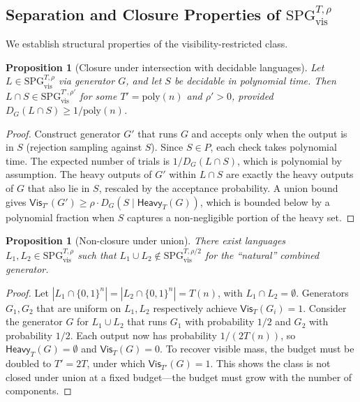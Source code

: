 \documentclass[11pt]{article}
\newcommand{\SPGvis}[2]{\mathrm{SPG}_{\mathrm{vis}}^{#1,#2}}
\newtheorem{proposition}[definition]{Proposition}
\theoremstyle{remark}
\theoremstyle{definition}
\begin{document}
\subsection{Separation and Closure Properties of $\SPGvis{T}{\rho}$}\label{sec:spg-vis-closure}

We establish structural properties of the visibility-restricted class.

\begin{proposition}[Closure under intersection with decidable languages]\label{prop:closure-intersection}
Let $L \in \SPGvis{T}{\rho}$ via generator $G$, and let $S$ be decidable in
polynomial time.  Then $L \cap S \in \SPGvis{T'}{\rho'}$ for some
$T' = \mathrm{poly}(n)$ and $\rho' > 0$, provided
$D_G(L \cap S) \ge 1/\mathrm{poly}(n)$.
\end{proposition}

\begin{proof}
Construct generator $G'$ that runs $G$ and accepts only when the output is in
$S$ (rejection sampling against $S$).  Since $S \in P$, each check takes
polynomial time.  The expected number of trials is $1/D_G(L \cap S)$, which
is polynomial by assumption.  The heavy outputs of $G'$ within $L \cap S$ are
exactly the heavy outputs of $G$ that also lie in $S$, rescaled by the
acceptance probability.  A union bound gives $\mathsf{Vis}_{T'}(G') \ge
\rho \cdot D_G(S \mid \mathsf{Heavy}_T(G))$, which is bounded below by a
polynomial fraction when $S$ captures a non-negligible portion of the heavy
set.
\end{proof}

\begin{proposition}[Non-closure under union]\label{prop:non-closure-union}
There exist languages $L_1, L_2 \in \SPGvis{T}{\rho}$ such that
$L_1 \cup L_2 \notin \SPGvis{T}{\rho/2}$ for the ``natural'' combined
generator.
\end{proposition}

\begin{proof}
Let $|L_1 \cap \{0,1\}^n| = |L_2 \cap \{0,1\}^n| = T(n)$, with $L_1 \cap L_2 = \emptyset$.
Generators $G_1, G_2$ that are uniform on $L_1, L_2$ respectively achieve
$\mathsf{Vis}_T(G_i) = 1$.  Consider the generator $G$ for $L_1 \cup L_2$ that
runs $G_1$ with probability $1/2$ and $G_2$ with probability $1/2$.  Each
output now has probability $1/(2T(n))$, so $\mathsf{Heavy}_{T}(G) = \emptyset$
and $\mathsf{Vis}_T(G) = 0$.  To recover visible mass, the budget must be
doubled to $T' = 2T$, under which $\mathsf{Vis}_{T'}(G) = 1$.  This shows
the class is not closed under union at a fixed budget---the budget must grow
with the number of components.
\end{proof}
\end{document}
